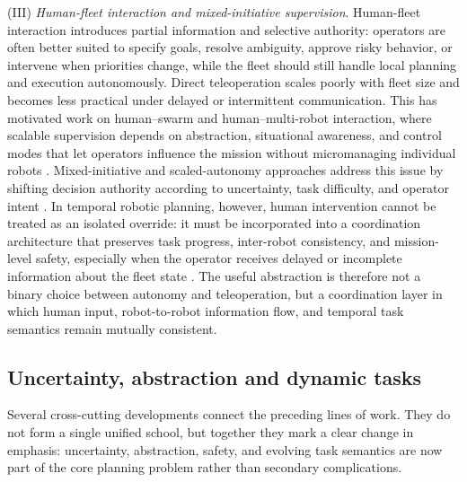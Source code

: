  (III) \emph{Human-fleet interaction and mixed-initiative supervision}.
Human-fleet interaction introduces partial information and selective authority:
operators are often better suited to specify goals, resolve ambiguity, approve
risky behavior, or intervene when priorities change, while the fleet should
still handle local planning and execution autonomously. Direct teleoperation
scales poorly with fleet size and becomes less practical under delayed or
intermittent communication. This has motivated work on human--swarm and
human--multi-robot interaction, where scalable supervision depends on
abstraction, situational awareness, and control modes that let operators
influence the mission without micromanaging individual robots
\citep{crandall2017human, nam2018survey, dahiya2023survey,
lyons2025examining}. Mixed-initiative and scaled-autonomy approaches address
this issue by shifting decision authority according to uncertainty, task
difficulty, and operator intent
\citep{jiang2019mixed, kortenkamp2016integrating}. In temporal robotic planning,
however, human intervention cannot be treated as an isolated override: it must
be incorporated into a coordination architecture that preserves task progress,
inter-robot consistency, and mission-level safety, especially when the operator
receives delayed or incomplete information about the fleet state
\citep{jhunjhunwala2021ihero, orton2020madcat, walker2023ar}. The useful
abstraction is therefore not a binary choice between autonomy and teleoperation,
but a coordination layer in which human input, robot-to-robot information flow,
and temporal task semantics remain mutually consistent.


\subsection{Uncertainty, abstraction and dynamic tasks}
\label{sec:ch01:rw:extensions}

Several cross-cutting developments connect the preceding lines of work. They do not form a
single unified school, but together they mark a clear change in emphasis: uncertainty,
abstraction, safety, and evolving task semantics are now part of the core planning problem
rather than secondary complications.

